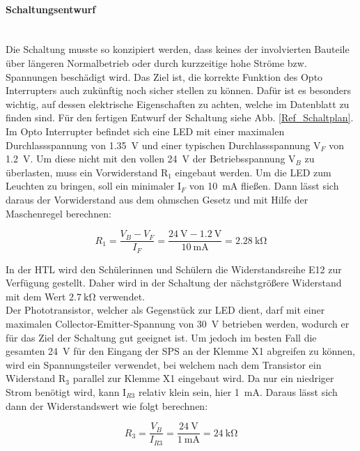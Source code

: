 \paragraph{Schaltungsentwurf} \mbox{}\\
Die Schaltung musste so konzipiert werden, dass keines der involvierten Bauteile über längeren Normalbetrieb oder durch kurzzeitige hohe Ströme bzw. Spannungen beschädigt wird. Das Ziel ist, die korrekte Funktion des Opto Interrupters auch zukünftig noch sicher stellen zu können. Dafür ist es besonders wichtig, auf dessen elektrische Eigenschaften zu achten, welche im Datenblatt zu finden sind. Für den fertigen Entwurf der Schaltung siehe Abb. \ref{Ref_Schaltplan}.\\
Im Opto Interrupter befindet sich eine LED mit einer maximalen Durchlassspannung von \qty{1.35}{\volt} und einer typischen Durchlassspannung V$_{F}$ von \qty{1.2}{\volt}. Um diese nicht mit den vollen \qty{24}{\volt} der Betriebsspannung V$_{B}$ zu überlasten, muss ein Vorwiderstand R$_{1}$ eingebaut werden. Um die LED zum Leuchten zu bringen, soll ein minimaler I$_{F}$ von \qty{10}{\milli\ampere} fließen. Dann lässt sich daraus der Vorwiderstand aus dem ohmschen Gesetz und mit Hilfe der Maschenregel berechnen:

\begin{equation*}
    R_{1} = \frac{V_{B} - V_{F}}{I_{F}} = \frac{\qty{24}{\volt} - \qty{1.2}{\volt}}{\qty{10}{\milli\ampere}} = \qty{2.28}{\kilo\ohm}
\end{equation*}

In der HTL wird den Schülerinnen und Schülern die Widerstandsreihe E12 zur Verfügung gestellt. Daher wird in der Schaltung der nächstgrößere Widerstand mit dem Wert $\qty{2,7}{\kilo\ohm}$ verwendet.\\
Der Phototransistor, welcher als Gegenstück zur LED dient, darf mit einer maximalen Collector-Emitter-Spannung von \qty{30}{\volt} betrieben werden, wodurch er für das Ziel der Schaltung gut geeignet ist. Um jedoch im besten Fall die gesamten \qty{24}{\volt} für den Eingang der SPS an der Klemme X1 abgreifen zu können, wird ein Spannungsteiler verwendet, bei welchem nach dem Transistor ein Widerstand R$_{3}$ parallel zur Klemme X1 eingebaut wird. Da nur ein niedriger Strom benötigt wird, kann I$_{R3}$ relativ klein sein, hier \qty{1}{\milli\ampere}. Daraus lässt sich dann der Widerstandswert wie folgt berechnen:

\begin{equation*}
    R_{3} = \frac{V_{B}}{I_{R3}} = \frac{\qty{24}{\volt}}{\qty{1}{\milli\ampere}} = \qty{24}{\kilo\ohm}
\end{equation*}


